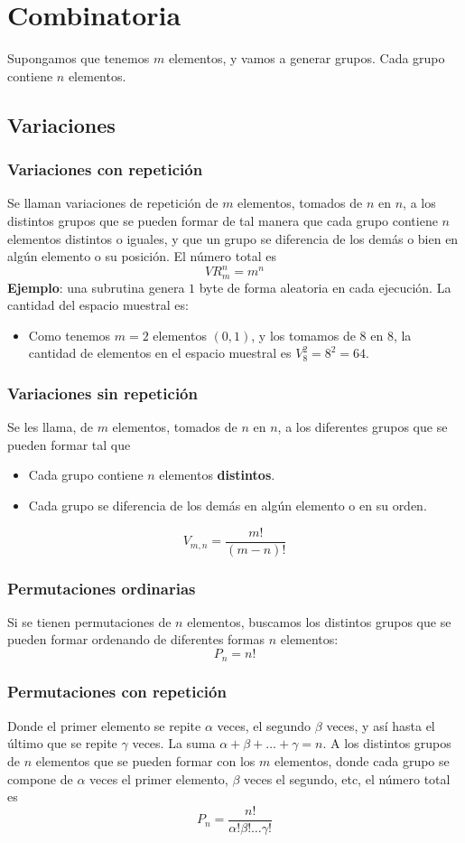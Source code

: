 \documentclass{./Probabilidad.tex}
\begin{document}
\chapter{Combinatoria}
Supongamos que tenemos $m$ elementos, y vamos a generar grupos. Cada grupo contiene $n$ elementos.
\section{Variaciones}
\subsection{Variaciones con repetición}
Se llaman variaciones de repetición de $m$ elementos, tomados de $n$ en $n$, a los distintos grupos que se pueden formar de tal manera que cada grupo contiene $n$ elementos distintos o iguales, y que un grupo se diferencia de los demás o bien en algún elemento o su posición.
El número total es
$$
VR_{m}^n=m^{n}
$$
\textbf{Ejemplo}: una subrutina genera $1$ byte de forma aleatoria en cada ejecución. La cantidad del espacio muestral es:\\
\begin{itemize}
	\item Como tenemos $m=2$ elementos $(0,1)$, y los tomamos de $8$ en $8$, la cantidad de elementos en el espacio muestral es $V_{8}^{2}=8^{2}=64$.     
\end{itemize}
\subsection{Variaciones sin repetición}
Se les llama, de $m$ elementos, tomados de $n$ en $n$, a los diferentes grupos que se pueden formar tal que
\begin{itemize}
	\item Cada grupo contiene $n$ elementos \textbf{distintos}.
	\item Cada grupo se diferencia de los demás en algún elemento o en su orden.
\end{itemize}
$$
V_{m,n}=\frac{m!}{(m-n)!}
$$
\subsection{Permutaciones ordinarias}
Si se tienen permutaciones de $n$ elementos, buscamos los distintos grupos que se pueden formar ordenando de diferentes formas $n$ elementos:
$$
P_{n}=n!
$$
\subsection{Permutaciones con repetición}
Donde el primer elemento se repite $\alpha$ veces, el segundo $\beta$ veces, y así hasta el último que se repite $\gamma$ veces. La suma $\alpha+\beta+\dots+\gamma=n$. A los distintos grupos de $n$ elementos que se pueden formar con los $m$ elementos, donde cada grupo se compone de $\alpha$ veces el primer elemento, $\beta$ veces el segundo, etc, el número total es
$$
P_{n}= \frac{n!}{\alpha!\beta!\dots\gamma!}
$$
\end{document}
